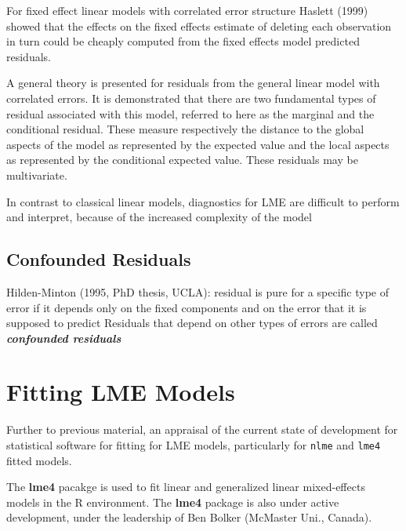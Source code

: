 \documentclass[12pt, a4paper]{report}
\theoremstyle{plain}
\theoremstyle{definition}
\theoremstyle{remark}
\begin{document}
	For fixed effect linear models with correlated error structure
	Haslett (1999) showed that the effects on the fixed effects
	estimate of deleting each observation in turn could be cheaply
	computed from the fixed effects model predicted residuals.
	
	
	A general theory is presented for residuals from the general
	linear model with correlated errors. It is demonstrated that there
	are two fundamental types of residual associated with this model,
	referred to here as the marginal and the conditional residual.
	These measure respectively the distance to the global aspects of
	the model as represented by the expected value and the local
	aspects as represented by the conditional expected value. These
	residuals may be multivariate.
	
	In contrast to classical linear models, diagnostics for LME are
	difficult to perform and interpret, because of the increased
	complexity of the model
	
	\section{Confounded Residuals}
	Hilden-Minton (1995, PhD thesis, UCLA): residual is pure for a specific type of error if it depends only on the fixed components and
	on the error that it is supposed to predict	Residuals that depend on other types of errors are called \textit{\textbf{confounded
			residuals}}
	
	
	\chapter{Fitting LME Models}
	Further to previous material, an appraisal of the current state of development for statistical software for fitting for LME models, particularly for \texttt{nlme} and \texttt{lme4} fitted models.
	
	
	The \textbf{lme4} pacakge is used to fit linear and generalized linear mixed-effects models in the R environment.
	The \textbf{lme4} package is also under active development, under the leadership of Ben Bolker (McMaster Uni., Canada).
	
\end{document}
